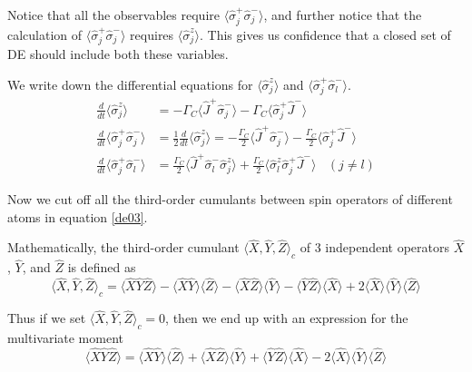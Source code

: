 \documentclass{article}
\newcommand{\gc}{\Gamma_C}
\begin{document}

Notice that all the observables require $\langle\hat{\sigma}^+_j\hat{\sigma}^-_j\rangle$, and further notice that the calculation of $\langle\hat{\sigma}^+_j\hat{\sigma}^-_j\rangle$ requires $\langle\hat{\sigma}^z_j\rangle$. This gives us confidence that a closed set of DE should include both these variables. 

We write down the differential equations for $\langle\hat{\sigma}^z_j\rangle$ and $\langle\hat{\sigma}^+_j\hat{\sigma}^-_l\rangle$. 
\begin{align}
\label{de01}
\frac{d}{dt}\langle\hat{\sigma}^z_j\rangle&=-\gc\langle\hat{J}^+\hat{\sigma}^-_j\rangle-\gc\langle\hat{\sigma}_j^+\hat{J}^-\rangle\\
\label{de02}
\frac{d}{dt}\langle\hat{\sigma}^+_j\hat{\sigma}^-_j\rangle&=\frac{1}{2}\frac{d}{dt}\langle\hat{\sigma}^z_j\rangle=-\frac{\gc}{2}\langle\hat{J}^+\hat{\sigma}^-_j\rangle-\frac{\gc}{2}\langle\hat{\sigma}_j^+\hat{J}^-\rangle\\
\label{de03}
\frac{d}{dt}\langle\hat{\sigma}^+_j\hat{\sigma}^-_l\rangle&=\frac{\gc}{2}\langle \hat{J}^+\hat{\sigma}^-_l\hat{\sigma}^z_j\rangle+ \frac{\gc}{2}\langle \hat{\sigma}^z_l\hat{\sigma}^+_j\hat{J}^-\rangle\ \ \ \ (j\neq l)
\end{align}

Now we cut off all the third-order cumulants between spin operators of different atoms in equation \ref{de03}. 

Mathematically, the third-order cumulant $\langle \hat{X},\hat{Y},\hat{Z} \rangle_c$ of 3 independent operators $\hat{X}$, $\hat{Y}$, and $\hat{Z}$ is defined as
\begin{equation}
    \langle \hat{X},\hat{Y},\hat{Z}\rangle_c = \langle \hat{X} \hat{Y} \hat{Z} \rangle-\langle \hat{X} \hat{Y} \rangle \langle \hat{Z}\rangle-\langle \hat{X} \hat{Z} \rangle \langle \hat{Y}\rangle-\langle \hat{Y} \hat{Z} \rangle \langle \hat{X}\rangle
    +2\langle \hat{X} \rangle \langle \hat{Y}\rangle \langle  \hat{Z} \rangle
\end{equation}

Thus if we set $\langle \hat{X},\hat{Y},\hat{Z}\rangle_c=0$, then we end up with an expression for the multivariate moment
\begin{equation}
\label{moment}
    \langle \hat{X} \hat{Y} \hat{Z} \rangle=\langle \hat{X} \hat{Y} \rangle \langle \hat{Z}\rangle+\langle \hat{X} \hat{Z} \rangle \langle \hat{Y}\rangle+\langle \hat{Y} \hat{Z} \rangle \langle \hat{X}\rangle
    -2\langle \hat{X} \rangle \langle \hat{Y}\rangle \langle  \hat{Z} \rangle
\end{equation}
\end{document}
